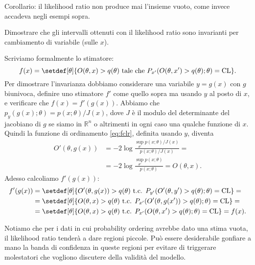 Corollario: il likelihood ratio non produce mai l'insieme vuoto, come invece
accadeva negli esempi sopra.

\begin{exercise} \label{ex:lrinv}
    Dimostrare che gli intervalli ottenuti con il likelihood ratio sono
    invarianti per cambiamento di variabile (sulle $x$).
\end{exercise}

\begin{solution}
    Scriviamo formalmente lo stimatore:
    \begin{equation*}
        f(x) = \setdef[\theta]{O(\theta,x) > q(\theta) \text{ tale che }
        P_{x'}(O(\theta,x') > q(\theta);\theta) = \mathrm{CL}}.
    \end{equation*}
    Per dimostrare l'invarianza dobbiamo considerare una variabile $y = g(x)$
    con $g$ biunivoca, definire uno stimatore $f'$ come quello sopra ma usando
    $y$ al posto di $x$, e verificare che $f(x) = f'(g(x))$. Abbiamo che
    $p_y(g(x);\theta) = p(x;\theta)/J(x)$, dove $J$ è il modulo del
    determinante del jacobiano di $g$ se siamo in $\mathbb R^n$ o altrimenti in
    ogni caso una qualche funzione di $x$. Quindi la funzione di ordinamento
    \eqref{eq:fclr}, definita usando $y$, diventa
    \begin{align*}
        O'(\theta, g(x)) &= -2\log\frac
        {\sup_{\theta'} p(x;\theta)/J(x)}{p(x;\theta)/J(x)} = \\
        &= -2\log\frac
        {\sup_{\theta'} p(x;\theta)}{p(x;\theta)}
        = O(\theta, x).
    \end{align*}
    Adesso calcoliamo $f'(g(x))$:
    \begin{align*}
        f'(g(x))
        &= \setdef[\theta]{O'(\theta,g(x)) > q(\theta) \text{ t.c. }
        P_{y'}(O'(\theta, y') > q(\theta);\theta) = \mathrm{CL}} = \\
        &= \setdef[\theta]{O(\theta,x) > q(\theta) \text{ t.c. }
        P_{x'}(O'(\theta, g(x')) > q(\theta);\theta) = \mathrm{CL}} = \\
        &= \setdef[\theta]{O(\theta,x) > q(\theta) \text{ t.c. }
        P_{x'}(O(\theta, x') > q(\theta);\theta) = \mathrm{CL}}
        = f(x).
    \end{align*}
\end{solution}

Notiamo che per i dati in cui probability ordering avrebbe dato una stima vuota,
il likelihood ratio tenderà a dare regioni piccole.
Può essere desiderabile gonfiare a mano la banda di confidenza in queste regioni
per evitare di triggerare molestatori che vogliono discutere della validità del modello.

